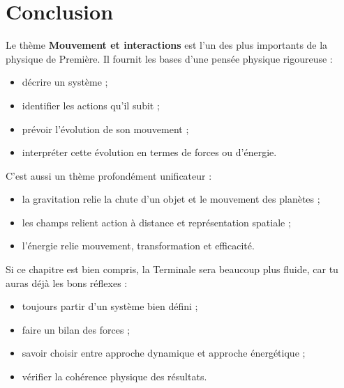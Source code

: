 \documentclass[11pt,a4paper]{article}
\begin{document}
\section*{Conclusion}

Le thème \textbf{Mouvement et interactions} est l'un des plus importants de la physique de Première.  
Il fournit les bases d'une pensée physique rigoureuse :

\begin{itemize}
    \item décrire un système ;
    \item identifier les actions qu'il subit ;
    \item prévoir l'évolution de son mouvement ;
    \item interpréter cette évolution en termes de forces ou d'énergie.
\end{itemize}

C'est aussi un thème profondément unificateur :
\begin{itemize}
    \item la gravitation relie la chute d'un objet et le mouvement des planètes ;
    \item les champs relient action à distance et représentation spatiale ;
    \item l'énergie relie mouvement, transformation et efficacité.
\end{itemize}

\begin{terminalebox}
Si ce chapitre est bien compris, la Terminale sera beaucoup plus fluide, car tu auras déjà les bons réflexes :
\begin{itemize}
    \item toujours partir d'un système bien défini ;
    \item faire un bilan des forces ;
    \item savoir choisir entre approche dynamique et approche énergétique ;
    \item vérifier la cohérence physique des résultats.
\end{itemize}
\end{terminalebox}
\end{document}

